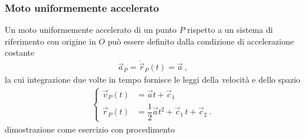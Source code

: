 \documentclass[letterpaper,10pt,italian]{jupyterBook}
\begin{document}
\subsubsection{Moto uniformemente accelerato}
\label{\detokenize{ch/mechanics/kinematics-point:moto-uniformemente-accelerato}}\label{\detokenize{ch/mechanics/kinematics-point:physics-hs-mechanics-kinematics-point-motion-a}}
\sphinxAtStartPar
Un moto uniformemente accelerato di un punto \(P\) rispetto a un sistema di riferimento con origine in \(O\) può essere definito dalla condizione di accelerazione costante
\begin{equation*}
\begin{split}\vec{a}_P = \ddot{\vec{r}}_P(t) = \vec{a} \ ,\end{split}
\end{equation*}
\sphinxAtStartPar
la cui integrazione due volte in tempo fornisce le leggi della velocità e dello spazio
\begin{equation*}
\begin{split}\begin{cases}
  \vec{v}_P(t) & = \vec{a} t               + \vec{c}_1 \\
  \vec{r}_P(t) & = \dfrac{1}{2}\vec{a} t^2 + \vec{c}_1 \, t + \vec{c}_2 \ .
\end{cases}\end{split}
\end{equation*}
\sphinxAtStartPar
{} dimostrazione come esercizio con procedimento
\end{document}
